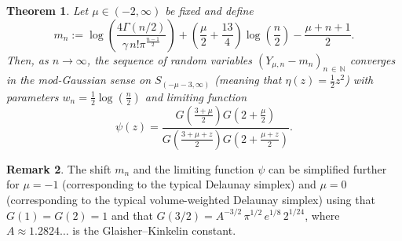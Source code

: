 \documentclass[10pt]{amsart}
\newtheorem{theo}{Theorem}[section]
\theoremstyle{definition}\newtheorem{defi}[theo]{Definition}\newtheorem{rema}[theo]{Remark}\newtheorem{exam}[theo]{Example}\newtheorem{exem}[theo]{Example}\newtheorem{nota}[theo]{Notation}
\newcommand{\N}{\mathbb{N}}
\begin{document}
\begin{theo}\label{thm:ModPhi}
Let $\mu\in(-2,\infty)$ be fixed and define
\[
m_n:=\log\left(\frac{4\Gamma(n/2)}{\gamma\,n!\pi^{\frac{n-1}{2}}}\right)+\left(\frac{\mu}{2}+\frac{13}{4}\right)\log\left(\frac{n}{2}\right)-\frac{\mu+n+1}{2}.
\]
Then, as $n\to\infty$, the sequence of random variables $(Y_{\mu,n}-m_n)_{n\,\in\,\N}$ converges in the mod-Gaussian sense on $S_{(-\mu-3,\infty)}$ (meaning that $\eta(z)=\frac{1}{2}z^2$) with parameters $w_n=\frac{1}{2}\log\left(\frac{n}{2}\right)$ and limiting function
\begin{equation}\label{eq:DefPsi}
\psi(z)=\frac{G\left(\frac{3+\mu}{2}\right)G\left(2+\frac{\mu}{2}\right)}{G\left(\frac{3+\mu+z}{2}\right) G\left(2+\frac{\mu+z}{2}\right)}.
\end{equation}
\end{theo}


\begin{rema}
The shift $m_n$ and the limiting function $\psi$ can be simplified further for $\mu=-1$ (corresponding to the typical Delaunay simplex) and $\mu=0$ (corresponding to the typical volume-weighted Delaunay simplex) using that $G(1)=G(2)=1$ and that $G(3/2)=A^{-3/2}\,\pi^{1/2}\,e^{1/8}\,2^{1/24}$, where $A\approx 1.2824\ldots$ is the Glaisher--Kinkelin constant.
\end{rema}
\end{document}
